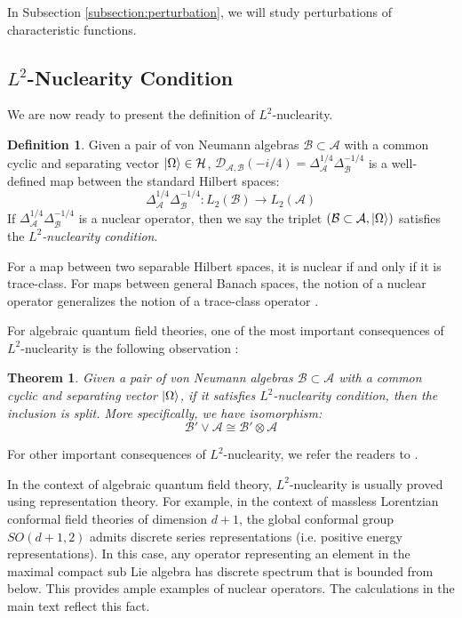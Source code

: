 \documentclass[a4paper,11pt]{article}
\newtheorem{theorem}{Theorem}
\theoremstyle{definition}
\newtheorem{definition}{Definition}[section]
\begin{document}
In Subsection \ref{subsection:perturbation}, we will study perturbations of characteristic functions.
\subsection{$L^2$-Nuclearity Condition}\label{subsection:l2nuclearity}
We are now ready to present the definition of $L^2$-nuclearity.
\begin{definition}
    Given a pair of von Neumann algebras $\mathcal{B}\subset\mathcal{A}$ with a common cyclic and separating vector $\ket{\Omega}\in\mathcal{H}$, $\mathcal{D}_{\mathcal{A}, \mathcal{B}}(-i/4) = \Delta_\mathcal{A}^{1/4}\Delta_\mathcal{B}^{-1/4}$ is a well-defined map between the standard Hilbert spaces:
    \begin{equation}
        \Delta_\mathcal{A}^{1/4}\Delta_\mathcal{B}^{-1/4}: L_2(\mathcal{B})\rightarrow L_2(\mathcal{A})
    \end{equation} 
    If $\Delta_\mathcal{A}^{1/4}\Delta_\mathcal{B}^{-1/4}$ is a nuclear operator, then we say the triplet $(\mathcal{B}\subset\mathcal{A}, \ket{\Omega})$ satisfies the \textit{$L^2$-nuclearity condition}.
\end{definition}
For a map between two separable Hilbert spaces, it is nuclear if and only if it is trace-class. For maps between general Banach spaces, the notion of a nuclear operator generalizes the notion of a trace-class operator \cite{nuclearandsumming}.

For algebraic quantum field theories, one of the most important consequences of $L^2$-nuclearity is the following observation \cite{buchholz2007nuclearity}:
\begin{theorem}
    Given a pair of von Neumann algebras $\mathcal{B}\subset\mathcal{A}$ with a common cyclic and separating vector $\ket{\Omega}$, if it satisfies $L^2$-nuclearity condition, then the inclusion is split. More specifically, we have isomorphism:
    \begin{equation}
        \mathcal{B}'\vee\mathcal{A}\cong\mathcal{B}'\otimes\mathcal{A}
    \end{equation}
\end{theorem}
For other important consequences of $L^2$-nuclearity, we refer the readers to \cite{buchholz2007nuclearity}. 

In the context of algebraic quantum field theory, $L^2$-nuclearity is usually proved using representation theory. For example, in the context of massless Lorentzian conformal field theories of dimension $d + 1$, the global conformal group $SO(d + 1, 2)$ admits discrete series representations (i.e. positive energy representations). In this case, any operator representing an element in the maximal compact sub Lie algebra has discrete spectrum that is bounded from below. This provides ample examples of nuclear operators. The calculations in the main text reflect this fact.
\end{document}
